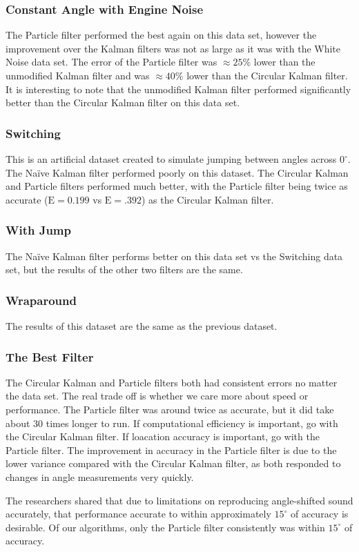 \documentclass[11pt]{amsart}
\begin{document}
\subsubsection{Constant Angle with Engine Noise}
The Particle filter performed the best again on this data set, however the improvement over the Kalman filters was not as large as it was with the White Noise data set. The error of the Particle filter was $\approx 25\%$ lower than the unmodified Kalman filter and was $\approx 40\%$ lower than the Circular Kalman filter. It is interesting to note that the unmodified Kalman filter performed significantly better than the Circular Kalman filter on this data set.
\subsubsection{Switching}
This is an artificial dataset created to simulate jumping between angles across $0^{\circ}$. The Naïve Kalman filter performed poorly on this dataset. The Circular Kalman and Particle filters performed much better, with the Particle filter being twice as accurate ($\mathrm{E}=0.199$ vs $\mathrm{E}=.392$) as the Circular Kalman filter.
\subsubsection{With Jump}
The Naïve Kalman filter performs better on this data set vs the Switching data set, but the results of the other two filters are the same.
\subsubsection{Wraparound}
The results of this dataset are the same as the previous dataset.
\subsubsection{The Best Filter}
The Circular Kalman and Particle filters both had consistent errors no matter the data set. The real trade off is whether we care more about speed or performance. The Particle filter was around twice as accurate, but it did take about 30 times longer to run. If computational efficiency is important, go with the Circular Kalman filter. If loacation accuracy is important, go with the Particle filter. The improvement in accuracy in the Particle filter is due to the lower variance compared with the Circular Kalman filter, as both responded to changes in angle measurements very quickly.

The researchers shared that due to limitations on reproducing angle-shifted sound accurately, that performance accurate to within approximately $15^{\circ}$ of accuracy is desirable. Of our algorithms, only the Particle filter consistently was within $15^{\circ}$ of accuracy.
\end{document}
